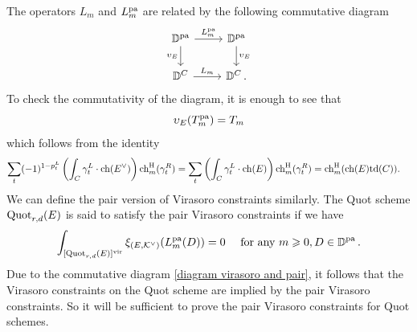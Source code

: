 \documentclass[11pt]{amsart}
\theoremstyle{remark}
\newcommand{\ch}{{\rm ch}}
\newcommand{\D}{\mathbb{D}}
\newcommand{\quot}[0]{\textnormal{Quot}}
\newcommand{\vir}[0]{\textnormal{vir}}
\newcommand{\td}[0]{\textnormal{td}}
\newcommand{\pa}[0]{\textnormal{pa}}
\newcommand{\chh}[0]{\textnormal{ch}^\textnormal{H}}
\newcommand{\kv}{{\mathcal K^\vee}}
\numberwithin{theorem}{section}
\begin{document}
The operators $L_m$ and $L_m^\pa$ are related by the following commutative diagram
\begin{equation}\label{diagram virasoro and pair}
\begin{tikzcd}
\D^\pa\arrow[d, swap, "\upsilon_E"] \arrow[r,"L_m^\pa"]& \D^\pa \arrow[d, "\upsilon_E"]\\
\D^C\arrow[r, "L_m"]& \D^C \,.
\end{tikzcd}
\end{equation}
To check the commutativity of the diagram, it is enough to see that
$$ \upsilon_E(T_m^\pa) = T_m$$
which follows from the identity
\begin{align*}
\sum_{t}(-1)^{1-p_t^L}\left(\int_C \gamma_t^L \cdot \ch(E^\vee) \right)\chh_m(\gamma_t^R)&=\sum_t \left(\int_C \gamma_t^L \cdot \ch(E) \right)\chh_m(\gamma_t^R)
=\chh_m(\ch(E) \td(C)).
\end{align*}
We can define the pair version of Virasoro constraints similarly.
The Quot scheme $\quot_{r,d}(E)$ is said to satisfy
        the pair Virasoro constraints if we have
        \begin{equation}\label{Conjecture Virasoro pair}
            \int_{[\quot_{r,d}(E)]^\vir} \xi_{(E,\kv)} (L^\pa_m(D)) = 0 \quad \text{ for any } m \geqslant 0, D \in \D^\pa\,.
        \end{equation}
Due to the commutative diagram \eqref{diagram virasoro and pair}, it follows that the Virasoro constraints on the Quot scheme
are implied by the pair Virasoro constraints.
So it will be sufficient to prove the pair Virasoro constraints for Quot schemes.
    
\end{document}
